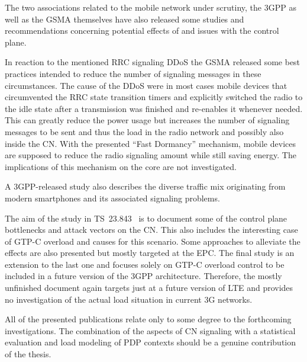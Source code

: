 The two associations related to the mobile network under scrutiny, the \gls{3GPP} as well as the \gls{GSMA} themselves have also released some studies and recommendations concerning potential effects of and issues with the control plane. 

In reaction to the mentioned \gls{RRC} signaling \gls{DDoS} the \gls{GSMA} released some best practices \cite{gsma2011fdbestpract} intended to reduce the number of signaling messages in these circumstances. The cause of the \gls{DDoS} were in most cases mobile devices that circumvented the \gls{RRC} state transition timers and explicitly switched the radio to the idle state after a transmission was finished and re-enables it whenever needed. This can greatly reduce the power usage but increases the number of signaling messages to be sent and thus the load in the radio network and possibly also inside the \gls{CN}. With the presented ``Fast Dormancy'' mechanism, mobile devices are supposed to reduce the radio signaling amount while still saving energy. The implications of this mechanism on the core are not investigated.

A \gls{3GPP}-released study \cite{3gpp.22.801} also describes the diverse traffic mix originating from modern smartphones and its associated signaling problems.

The aim of the study in \gls{TS}~23.843~\cite{3gpp.23.843} is to document some of the control plane bottlenecks and attack vectors on the \gls{CN}. This also includes the interesting case of \gls{GTP-C} overload and causes for this scenario. Some approaches to alleviate the effects are also presented but mostly targeted at the \gls{EPC}. The final study is an extension to the last one \cite{3gpp.29.807} and focuses solely on \gls{GTP-C} overload control to be included in a future version of the \gls{3GPP} architecture. Therefore, the mostly unfinished document again targets just at a future version of \gls{LTE} and provides no investigation of the actual load situation in current \gls{3G} networks.

All of the presented publications relate only to some degree to the forthcoming investigations. The combination of the aspects of \gls{CN} signaling with a statistical evaluation and load modeling of \gls{PDP} contexts should be a genuine contribution of the thesis.



